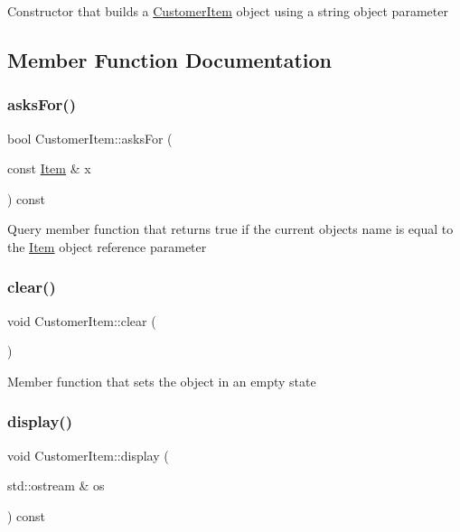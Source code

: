 Constructor that builds a \mbox{\hyperlink{classCustomerItem}{Customer\+Item}} object using a string object parameter 

\subsection{Member Function Documentation}
\mbox{\label{classCustomerItem_a6275dac4b75e3cd8e56f504140cd135d}} 
\subsubsection{\texorpdfstring{asks\+For()}{asksFor()}}
{\footnotesize\ttfamily bool Customer\+Item\+::asks\+For (\begin{DoxyParamCaption}\item[{const \mbox{\hyperlink{classItem}{Item}} \&}]{x }\end{DoxyParamCaption}) const}

Query member function that returns true if the current object\textquotesingle{}s name is equal to the \mbox{\hyperlink{classItem}{Item}} object reference parameter \mbox{\label{classCustomerItem_af6a25490940dcac3842f877ea0da4580}} 
\subsubsection{\texorpdfstring{clear()}{clear()}}
{\footnotesize\ttfamily void Customer\+Item\+::clear (\begin{DoxyParamCaption}{ }\end{DoxyParamCaption})}

Member function that sets the object in an empty state \mbox{\label{classCustomerItem_a2aaa8551a3662bb4b2953704580fc408}} 
\subsubsection{\texorpdfstring{display()}{display()}}
{\footnotesize\ttfamily void Customer\+Item\+::display (\begin{DoxyParamCaption}\item[{std\+::ostream \&}]{os }\end{DoxyParamCaption}) const}

